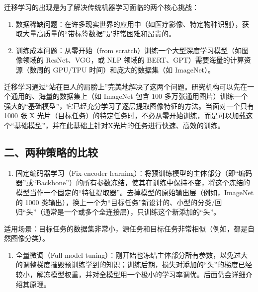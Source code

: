 迁移学习的出现是为了解决传统机器学习面临的两个核心挑战：

\begin{enumerate}
\def\labelenumi{\arabic{enumi}.}
\item
  数据稀缺问题：在许多现实世界的应用中（如医疗影像、特定物种识别），获取大量高质量的``带标签数据''是非常困难和昂贵的。
\item
  训练成本问题：从零开始（from scratch）训练一个大型深度学习模型（如图像领域的 ResNet、VGG，或 NLP 领域的 BERT、GPT）需要海量的计算资源（数周的 GPU/TPU 时间）和庞大的数据集（如 ImageNet）。
\end{enumerate}

迁移学习通过``站在巨人的肩膀上''完美地解决了这两个问题。研究机构可以先在一个通用的、海量的数据集上（如 ImageNet 包含 100 多万张通用图片）训练一个强大的``基础模型''，它已经充分学习了逐层提取图像特征的方法。当面对一个只有 1000 张 X 光片（目标任务）的特定任务时，不必从零开始训练，而是可以加载这个``基础模型''，并在此基础上针对X光片的任务进行快速、高效的训练。

\hypertarget{ux4e8cux4e24ux79cdux7b56ux7565ux7684ux6bd4ux8f83}{%
\subsection{二、两种策略的比较}\label{ux4e8cux4e24ux79cdux7b56ux7565ux7684ux6bd4ux8f83}}

\begin{enumerate}
\def\labelenumi{\arabic{enumi}.}
\tightlist
\item
  固定编码器学习（Fix-encoder learning）：将预训练模型的主体部分（即``编码器''或``Backbone''）的所有参数冻结，使其在训练中保持不变，将这个冻结的模型当作一个固定的``特征提取器''。去掉模型的原始输出层（例如，ImageNet 的 1000 类输出），换上一个为``目标任务''新设计的、小型的分类/回归``头''（通常是一个或多个全连接层），只训练这个新添加的``头''。
\end{enumerate}

适用场景：目标任务的数据集非常小，源任务和目标任务非常相似（例如，都是自然图像分类）。

\begin{enumerate}
\def\labelenumi{\arabic{enumi}.}
\setcounter{enumi}{1}
\tightlist
\item
  全量微调（Full-model tuning）：刚开始也冻结主体部分所有参数，以免过大的调整梯度摧毁预训练学到的知识；训练后期，损失对添加的``头''的梯度已经较小，解冻模型权重，并对全模型用一个极小的学习率调优。后面仍会详细介绍其原理。
\end{enumerate}

